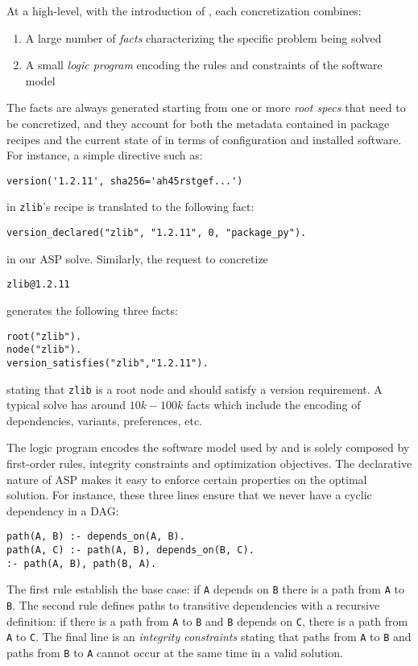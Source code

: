 At a high-level, with the introduction of \clingo, each concretization
combines:
\begin{enumerate}
\item A large number of \emph{facts} characterizing the specific problem being solved
\item A small \emph{logic program} encoding the rules and constraints of the software model
\end{enumerate}
The facts are always generated starting from one or more 
\emph{root specs} that need to be concretized, and they account 
for both the metadata contained in package recipes and the 
current state of \spack{} in terms of configuration and 
installed software.
For instance, a simple directive such as:
\begin{verbatim}
version('1.2.11', sha256='ah45rstgef...')
\end{verbatim}
in \texttt{zlib}'s recipe is translated to the following fact:
\begin{verbatim}
version_declared("zlib", "1.2.11", 0, "package_py").
\end{verbatim}
in our ASP solve. Similarly, the request to concretize
\begin{verbatim}
zlib@1.2.11
\end{verbatim}
generates the following three facts:
\begin{verbatim}
root("zlib").
node("zlib").
version_satisfies("zlib","1.2.11").
\end{verbatim}
stating that \texttt{zlib} is a root node and should satisfy
a version requirement.
A typical solve has around $10k-100k$ facts which include
the encoding of dependencies, variants, preferences, etc.

The logic program encodes the software model used by \spack{}
and is solely composed by first-order rules, integrity 
constraints and optimization objectives. 
The declarative nature of ASP makes it easy to enforce 
certain properties on the optimal solution. For instance, 
these three lines ensure that we never have a cyclic dependency
in a DAG:
\begin{verbatim}
path(A, B) :- depends_on(A, B).
path(A, C) :- path(A, B), depends_on(B, C).
:- path(A, B), path(B, A).
\end{verbatim}
The first rule establish the base case: if \texttt{A} depends
on \texttt{B} there is a path from \texttt{A} to \texttt{B}.
The second rule defines paths to transitive dependencies 
with a recursive definition: if there is a path from \texttt{A} 
to \texttt{B} and \texttt{B} depends on \texttt{C}, there is
a path from \texttt{A} to \texttt{C}. The final line is an 
\emph{integrity constraints} stating that paths from \texttt{A} 
to \texttt{B} and paths from \texttt{B} to \texttt{A} cannot 
occur at the same time in a valid solution.

